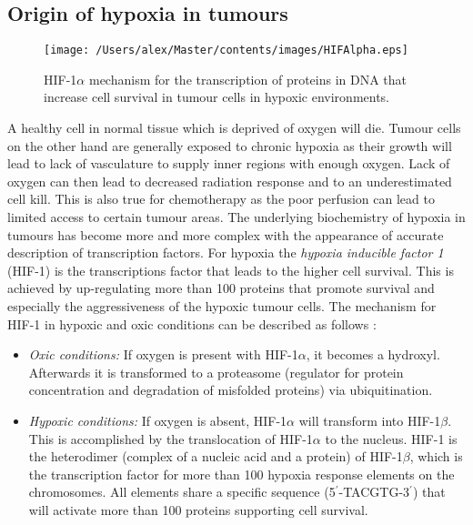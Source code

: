 \subsection{Origin of hypoxia in tumours}\label{chap:hypoxiaorigin}
\begin{figure}[tb]
\centering
\texttt{[image: /Users/alex/Master/contents/images/HIFAlpha.eps]}
\caption{HIF-1$\alpha$ mechanism for the transcription of proteins in DNA that increase cell survival in tumour cells in hypoxic environments.}
\label{fig:HIFAlpha}
\end{figure}
A healthy cell in normal tissue which is deprived of oxygen will die. Tumour cells on the other hand are generally exposed to chronic hypoxia as their growth will lead to lack of vasculature to supply inner regions with enough oxygen. Lack of oxygen can then lead to decreased radiation response and to an underestimated cell kill. This is also true for chemotherapy as the poor perfusion can lead to limited access to certain tumour areas. The underlying biochemistry of hypoxia in tumours has become more and more complex with the appearance of accurate description of transcription factors. For hypoxia the \textit{hypoxia inducible factor 1} (HIF-1) is the transcriptions factor that leads to the higher cell survival. This is achieved by up-regulating more than 100 proteins that promote survival and especially the aggressiveness of the hypoxic tumour cells. The mechanism for HIF-1 in hypoxic and oxic conditions can be described as follows \cite{pmid13130303}:
\begin{itemize}
\item \textit{Oxic conditions: }If oxygen is present with HIF-1$\alpha$, it becomes a hydroxyl. Afterwards it is transformed to a proteasome (regulator for protein concentration and degradation of misfolded proteins) via ubiquitination. 
\item \textit{Hypoxic conditions: } If oxygen is absent, HIF-1$\alpha$ will transform into HIF-1$\beta$. This is accomplished by the translocation of HIF-1$\alpha$ to the nucleus. HIF-1 is the heterodimer (complex of a nucleic acid and a protein) of HIF-1$\beta$, which is the transcription factor for more than 100 hypoxia response elements on the chromosomes. All elements share a specific sequence (5$^\prime$-TACGTG-3$^\prime$) that will activate more than 100 proteins supporting cell survival.
\end{itemize}

